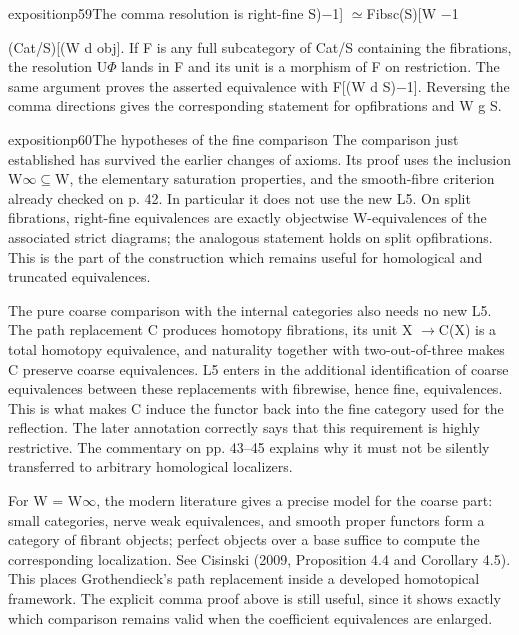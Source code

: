 \begin{dcomment}{exposition}{p59}{The comma resolution is right-fine}
S)\ensuremath{-}1] \ensuremath{\simeq}Fibsc(S)[W \ensuremath{-}1

(Cat/S)[(W d obj]. If F is any full subcategory of Cat/S containing the fibrations, the resolution U\ensuremath{\Phi} lands in F and its unit is a morphism of F on restriction. The same argument proves the asserted equivalence with F[(W d S)\ensuremath{-}1]. Reversing the comma directions gives the corresponding statement for opfibrations and W g S.

\end{dcomment}

\begin{dcomment}{exposition}{p60}{The hypotheses of the fine comparison}
The comparison just established has survived the earlier changes of axioms. Its proof uses the inclusion W\ensuremath{\infty}\ensuremath{\subseteq}W, the elementary saturation properties, and the smooth-fibre criterion already checked on p. 42. In particular it does not use the new L5. On split fibrations, right-fine equivalences are exactly objectwise W-equivalences of the associated strict diagrams; the analogous statement holds on split opfibrations. This is the part of the construction which remains useful for homological and truncated equivalences.

The pure coarse comparison with the internal categories also needs no new L5. The path replacement C produces homotopy fibrations, its unit X \ensuremath{\to}C(X) is a total homotopy equivalence, and naturality together with two-out-of-three makes C preserve coarse equivalences. L5 enters in the additional identification of coarse equivalences between these replacements with fibrewise, hence fine, equivalences. This is what makes C induce the functor back into the fine category used for the reflection. The later annotation correctly says that this requirement is highly restrictive. The commentary on pp. 43--45 explains why it must not be silently transferred to arbitrary homological localizers.

For W = W\ensuremath{\infty}, the modern literature gives a precise model for the coarse part: small categories, nerve weak equivalences, and smooth proper functors form a category of fibrant objects; perfect objects over a base suffice to compute the corresponding localization. See Cisinski (2009, Proposition 4.4 and Corollary 4.5). This places Grothendieck’s path replacement inside a developed homotopical framework. The explicit comma proof above is still useful, since it shows exactly which comparison remains valid when the coefficient equivalences are enlarged.

\end{dcomment}

